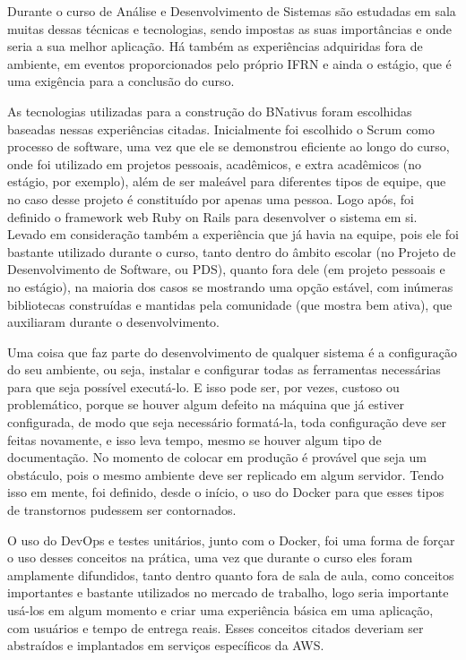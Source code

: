Durante o curso de Análise e Desenvolvimento de Sistemas são estudadas em sala muitas dessas técnicas e tecnologias, sendo impostas as suas importâncias e onde seria a sua melhor aplicação. Há também as experiências adquiridas fora de ambiente, em eventos proporcionados pelo próprio IFRN e ainda o estágio, que é uma exigência para a conclusão do curso.

As tecnologias utilizadas para a construção do BNativus foram escolhidas baseadas nessas experiências citadas. Inicialmente foi escolhido o Scrum como processo de software, uma vez que ele se demonstrou eficiente ao longo do curso, onde foi utilizado em projetos pessoais, acadêmicos, e extra acadêmicos (no estágio, por exemplo), além de ser maleável para diferentes tipos de equipe, que no caso desse projeto é constituído por apenas uma pessoa. Logo após, foi definido o framework web Ruby on Rails para desenvolver o sistema em si. Levado em consideração também a experiência que já havia na equipe, pois ele foi bastante utilizado durante o curso, tanto dentro do âmbito escolar (no Projeto de Desenvolvimento de Software, ou PDS), quanto fora dele (em projeto pessoais e no estágio), na maioria dos casos se mostrando uma opção estável, com inúmeras bibliotecas construídas e mantidas pela comunidade (que mostra bem ativa), que auxiliaram durante o desenvolvimento.

Uma coisa que faz parte do desenvolvimento de qualquer sistema é a configuração do seu ambiente, ou seja, instalar e configurar todas as ferramentas necessárias para que seja possível executá-lo. E isso pode ser, por vezes, custoso ou problemático, porque se houver algum defeito na máquina que já estiver configurada, de modo que seja necessário formatá-la, toda configuração deve ser feitas novamente, e isso leva tempo, mesmo se houver algum tipo de documentação. No momento de colocar em produção é provável que seja um obstáculo, pois o mesmo ambiente deve ser replicado em algum servidor. Tendo isso em mente, foi definido, desde o início, o uso do Docker para que esses tipos de transtornos pudessem ser contornados.

O uso do DevOps e testes unitários, junto com o Docker, foi uma forma de forçar o uso desses conceitos na prática, uma vez que durante o curso eles foram amplamente difundidos, tanto dentro quanto fora de sala de aula, como conceitos importantes e bastante utilizados no mercado de trabalho, logo seria importante usá-los em algum momento e criar uma experiência básica em uma aplicação, com usuários e tempo de entrega reais. Esses conceitos citados deveriam ser abstraídos e implantados em serviços específicos da AWS.

